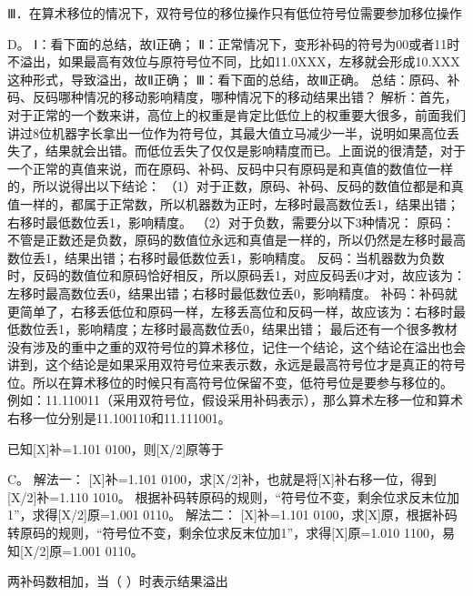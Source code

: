 Ⅲ．在算术移位的情况下，双符号位的移位操作只有低位符号位需要参加移位操作
\par{}
\begin{solution}D。 Ⅰ：看下面的总结，故Ⅰ正确；
Ⅱ：正常情况下，变形补码的符号为00或者11时不溢出，如果最高有效位与原符号位不同，比如11.0XXX，左移就会形成10.XXX这种形式，导致溢出，故Ⅱ正确；
Ⅲ：看下面的总结，故Ⅲ正确。
总结：原码、补码、反码哪种情况的移动影响精度，哪种情况下的移动结果出错？
解析：首先，对于正常的一个数来讲，高位上的权重是肯定比低位上的权重要大很多，前面我们讲过8位机器字长拿出一位作为符号位，其最大值立马减少一半，说明如果高位丢失了，结果就会出错。而低位丢失了仅仅是影响精度而已。上面说的很清楚，对于一个正常的真值来说，而在原码、补码、反码中只有原码是和真值的数值位一样的，所以说得出以下结论：
（1）对于正数，原码、补码、反码的数值位都是和真值一样的，都属于正常数，所以机器数为正时，左移时最高数位丢1，结果出错；右移时最低数位丢1，影响精度。
（2）对于负数，需要分以下3种情况：
原码：不管是正数还是负数，原码的数值位永远和真值是一样的，所以仍然是左移时最高数位丢1，结果出错；右移时最低数位丢1，影响精度。
反码：当机器数为负数时，反码的数值位和原码恰好相反，所以原码丢1，对应反码丢0才对，故应该为：左移时最高数位丢0，结果出错；右移时最低数位丢0，影响精度。
补码：补码就更简单了，右移丢低位和原码一样，左移丢高位和反码一样，故应该为：右移时最低数位丢1，影响精度；左移时最高数位丢0，结果出错；
最后还有一个很多教材没有涉及的重中之重的双符号位的算术移位，记住一个结论，这个结论在溢出也会讲到，这个结论是如果采用双符号位来表示数，永远是最高符号位才是真正的符号位。所以在算术移位的时候只有高符号位保留不变，低符号位是要参与移位的。
例如：11.110011（采用双符号位，假设采用补码表示），那么算术左移一位和算术右移一位分别是11.100110和11.111001。
\end{solution}
\question 已知{[}X{]}补=1.101 0100，则{[}X/2{]}原等于
\par{}
\begin{solution}C。 解法一： {[}X{]}补=1.101
0100，求{[}X/2{]}补，也就是将{[}X{]}补右移一位，得到{[}X/2{]}补=1.110
1010。
根据补码转原码的规则，``符号位不变，剩余位求反末位加1''，求得{[}X/2{]}原=1.001
0110。 解法二： {[}X{]}补=1.101
0100，求{[}X{]}原，根据补码转原码的规则，``符号位不变，剩余位求反末位加1''，求得{[}X{]}原=1.010
1100，易知{[}X/2{]}原=1.001 0110。
\end{solution}
\question 两补码数相加，当（ ）时表示结果溢出
\par{}
